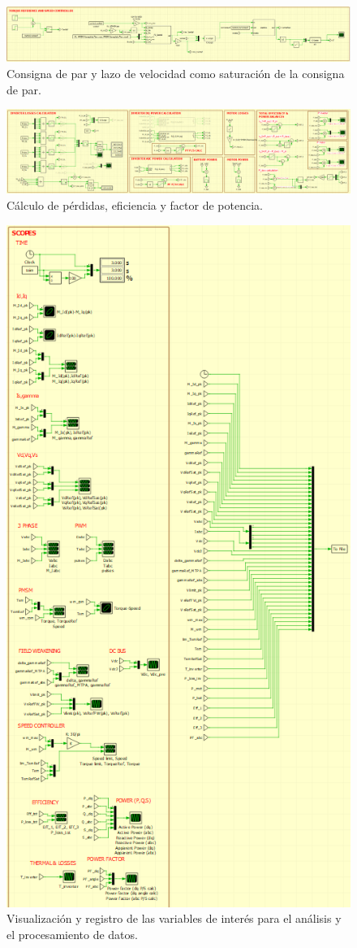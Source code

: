 \begin{figure}[H]
	\centering
	\includegraphics[width=0.9\linewidth]{fig/PLECS_tqspeed}
	\caption{Consigna de par y lazo de velocidad como saturación de la consigna de par.}
\end{figure}
\begin{figure}[H]
	\centering
	\includegraphics[width=0.7\linewidth]{fig/PLECS_losses}
	\caption{Cálculo de pérdidas, eficiencia y factor de potencia.}
\end{figure}
\begin{figure}[H]
	\centering
	\includegraphics[width=0.4\linewidth]{fig/PLECS_scopes}
	\caption{Visualización y registro de las variables de interés para el análisis y el procesamiento de datos.}
\end{figure}


